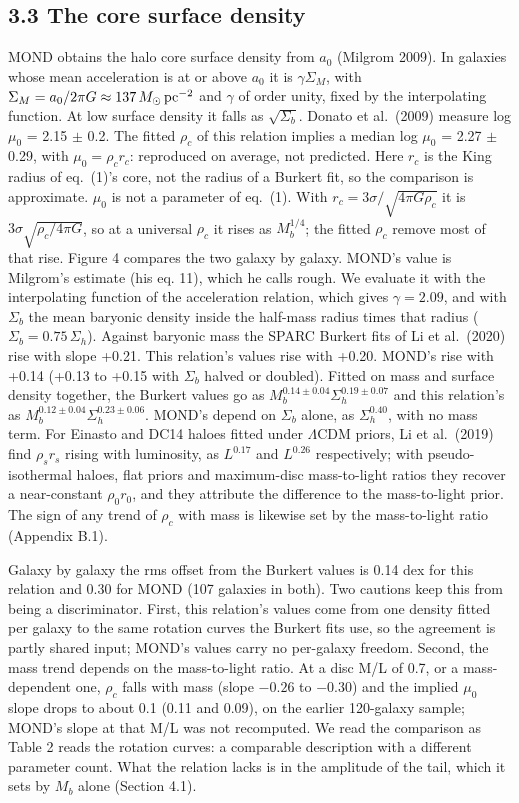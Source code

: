 \documentclass[
  10pt,
]{article}
\begin{document}
\subsection{3.3 The core surface density}\label{the-core-surface-density}

MOND obtains the halo core surface density from $a_0$ (Milgrom 2009). In galaxies whose mean acceleration is at or above $a_0$ it is $\gamma\Sigma_M$, with $\Sigma_M=a_0/2\pi G\approx137\,M_\odot\,{\rm pc}^{-2}$ and $\gamma$ of order unity, fixed by the interpolating function. At low surface density it falls as $\sqrt{\Sigma_b}$. Donato et al.~(2009) measure log $\mu_0$ = 2.15 $\pm$ 0.2. The fitted $\rho_c$ of this relation implies a median log $\mu_0$ = 2.27 $\pm$ 0.29, with $\mu_0=\rho_c r_c$: reproduced on average, not predicted. Here $r_c$ is the King radius of eq.~(1)'s core, not the radius of a Burkert fit, so the comparison is approximate. $\mu_0$ is not a parameter of eq.~(1). With $r_c=3\sigma/\sqrt{4\pi G\rho_c}$ it is $3\sigma\sqrt{\rho_c/4\pi G}$, so at a universal $\rho_c$ it rises as $M_b^{1/4}$; the fitted $\rho_c$ remove most of that rise. Figure 4 compares the two galaxy by galaxy. MOND's value is Milgrom's estimate (his eq. 11), which he calls rough. We evaluate it with the interpolating function of the acceleration relation, which gives $\gamma=2.09$, and with $\Sigma_b$ the mean baryonic density inside the half-mass radius times that radius ($\Sigma_b=0.75\,\Sigma_h$). Against baryonic mass the SPARC Burkert fits of Li et al.~(2020) rise with slope +0.21. This relation's values rise with +0.20. MOND's rise with +0.14 (+0.13 to +0.15 with $\Sigma_b$ halved or doubled). Fitted on mass and surface density together, the Burkert values go as $M_b^{0.14\pm0.04}\Sigma_h^{0.19\pm0.07}$ and this relation's as $M_b^{0.12\pm0.04}\Sigma_h^{0.23\pm0.06}$. MOND's depend on $\Sigma_b$ alone, as $\Sigma_h^{0.40}$, with no mass term. For Einasto and DC14 haloes fitted under $\Lambda$CDM priors, Li et al.~(2019) find $\rho_s r_s$ rising with luminosity, as $L^{0.17}$ and $L^{0.26}$ respectively; with pseudo-isothermal haloes, flat priors and maximum-disc mass-to-light ratios they recover a near-constant $\rho_0 r_0$, and they attribute the difference to the mass-to-light prior. The sign of any trend of $\rho_c$ with mass is likewise set by the mass-to-light ratio (Appendix B.1).

Galaxy by galaxy the rms offset from the Burkert values is 0.14 dex for this relation and 0.30 for MOND (107 galaxies in both). Two cautions keep this from being a discriminator. First, this relation's values come from one density fitted per galaxy to the same rotation curves the Burkert fits use, so the agreement is partly shared input; MOND's values carry no per-galaxy freedom. Second, the mass trend depends on the mass-to-light ratio. At a disc M/L of 0.7, or a mass-dependent one, $\rho_c$ falls with mass (slope $-0.26$ to $-0.30$) and the implied $\mu_0$ slope drops to about 0.1 (0.11 and 0.09), on the earlier 120-galaxy sample; MOND's slope at that M/L was not recomputed. We read the comparison as Table 2 reads the rotation curves: a comparable description with a different parameter count. What the relation lacks is in the amplitude of the tail, which it sets by $M_b$ alone (Section 4.1).
\end{document}
